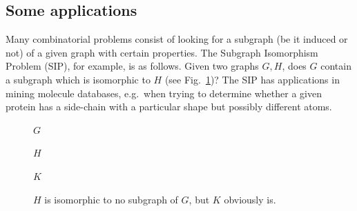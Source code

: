 \documentclass[a4paper]{book}
\theoremstyle{changebreak}                %
\begin{document}
\subsection{Some applications}
Many combinatorial problems consist of looking for a subgraph (be it
induced or not) of a given graph with certain properties. The {\sc
  Subgraph Isomorphism Problem} (SIP), for
example, is as follows. Given two graphs $G,H$, does $G$ contain a
subgraph which is isomorphic to $H$ (see Fig.~\ref{f:sip})? The SIP
has applications in mining molecule databases,
e.g.~when trying to determine whether a given protein
has a side-chain with a particular shape but
possibly different atoms.
\begin{figure}[!ht]
\begin{center}
\begin{minipage}{4cm}
$G$
\end{minipage}
\hspace*{0.5cm}
\begin{minipage}{4cm}
$H$
\end{minipage}
\hspace*{0.5cm}
\begin{minipage}{4cm}
$K$
\end{minipage}
\end{center}
\caption{$H$ is isomorphic to no subgraph of $G$, but $K$ obviously is.}
\label{f:sip}
\end{figure}
\end{document}
